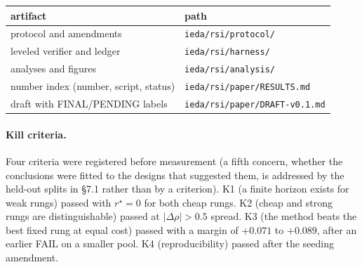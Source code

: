 \documentclass{article}
\begin{document}
\begin{center}
\begin{tabular}{ll}
\toprule
artifact & path \\
\midrule
protocol and amendments & \texttt{ieda/rsi/protocol/} \\
leveled verifier and ledger & \texttt{ieda/rsi/harness/} \\
analyses and figures & \texttt{ieda/rsi/analysis/} \\
number index (number, script, status) & \texttt{ieda/rsi/paper/RESULTS.md} \\
draft with FINAL/PENDING labels & \texttt{ieda/rsi/paper/DRAFT-v0.1.md} \\
\bottomrule
\end{tabular}
\end{center}

\paragraph{Kill criteria.} Four criteria were registered before measurement (a fifth
concern, whether the conclusions were fitted to the designs that suggested them, is
addressed by the held-out splits in \S7.1 rather than by a criterion). K1 (a
finite horizon exists for weak rungs) passed with $r^\star=0$ for both cheap rungs. K2
(cheap and strong rungs are distinguishable) passed at $|\Delta\rho|>0.5$ spread. K3
(the method beats the best fixed rung at equal cost) passed with a margin of
$+0.071$ to $+0.089$, after an earlier FAIL on a smaller pool. K4 (reproducibility)
passed after the seeding amendment.
\end{document}
